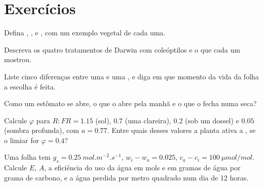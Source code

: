 \section{Exercícios}

\begin{exercise}[$\star$]\label{exo:b2:plant-plasticity:1}
Defina , ,  e
, com um exemplo vegetal de cada uma.
\end{exercise}

\begin{exercise}[$\star$]\label{exo:b2:plant-plasticity:2}
Descreva os quatro tratamentos de Darwin com coleóptilos e o que cada um mostrou.
\end{exercise}

\begin{exercise}[$\star$]\label{exo:b2:plant-plasticity:3}
Liste cinco diferenças entre uma  e uma , e
diga em que momento da vida da folha a escolha é feita.
\end{exercise}

\begin{exercise}[$\star$]\label{exo:b2:plant-plasticity:4}
Como um estômato se abre, o que o abre pela manhã e o que o fecha numa
seca?
\end{exercise}

\begin{exercise}[$\star\star$]\label{exo:b2:plant-plasticity:5}
Calcule $\varphi$ para $R{:}FR = 1.15$ (sol), $0.7$ (uma clareira),
$0.2$ (sob um dossel) e $0.05$ (sombra profunda), com $a = 0.77$. Entre
quais desses valores a planta ativa a , se o limiar
for $\varphi = 0.4$?
\end{exercise}

\begin{exercise}[$\star\star$]\label{exo:b2:plant-plasticity:6}
Uma folha tem $g_s = \qty{0.25}{mol.m^{-2}.s^{-1}}$, $w_i - w_a = 0.025$,
$c_a - c_i = \qty{100}{\micro mol/mol}$. Calcule $E$, $A$, a eficiência
do uso da água em mols e em gramas de água por grama de carbono, e a
água perdida por metro quadrado num dia de 12 horas.
\end{exercise}

